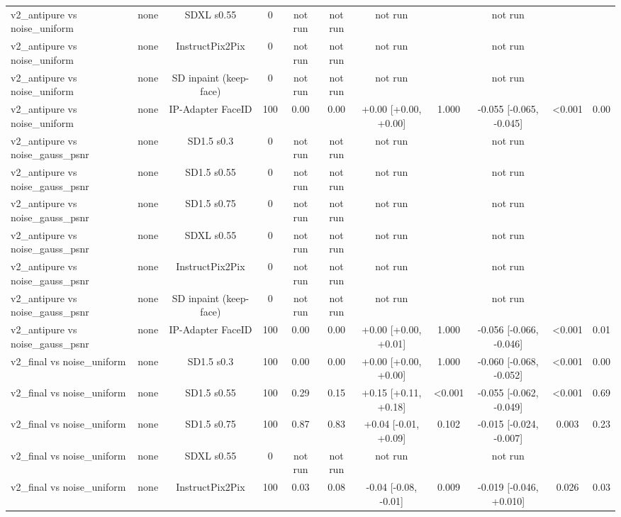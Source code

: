 \begin{table}[t]
{\begin{tabular}{lcccccccccc}
v2\_antipure vs noise\_uniform & none & SDXL s0.55 & 0 & not run & not run & not run &  & not run &  &  \\
v2\_antipure vs noise\_uniform & none & InstructPix2Pix & 0 & not run & not run & not run &  & not run &  &  \\
v2\_antipure vs noise\_uniform & none & SD inpaint (keep-face) & 0 & not run & not run & not run &  & not run &  &  \\
v2\_antipure vs noise\_uniform & none & IP-Adapter FaceID & 100 & 0.00 & 0.00 & +0.00 [+0.00, +0.00] & 1.000 & -0.055 [-0.065, -0.045] & <0.001 & 0.00 \\
v2\_antipure vs noise\_gauss\_psnr & none & SD1.5 s0.3 & 0 & not run & not run & not run &  & not run &  &  \\
v2\_antipure vs noise\_gauss\_psnr & none & SD1.5 s0.55 & 0 & not run & not run & not run &  & not run &  &  \\
v2\_antipure vs noise\_gauss\_psnr & none & SD1.5 s0.75 & 0 & not run & not run & not run &  & not run &  &  \\
v2\_antipure vs noise\_gauss\_psnr & none & SDXL s0.55 & 0 & not run & not run & not run &  & not run &  &  \\
v2\_antipure vs noise\_gauss\_psnr & none & InstructPix2Pix & 0 & not run & not run & not run &  & not run &  &  \\
v2\_antipure vs noise\_gauss\_psnr & none & SD inpaint (keep-face) & 0 & not run & not run & not run &  & not run &  &  \\
v2\_antipure vs noise\_gauss\_psnr & none & IP-Adapter FaceID & 100 & 0.00 & 0.00 & +0.00 [+0.00, +0.01] & 1.000 & -0.056 [-0.066, -0.046] & <0.001 & 0.01 \\
v2\_final vs noise\_uniform & none & SD1.5 s0.3 & 100 & 0.00 & 0.00 & +0.00 [+0.00, +0.00] & 1.000 & -0.060 [-0.068, -0.052] & <0.001 & 0.00 \\
v2\_final vs noise\_uniform & none & SD1.5 s0.55 & 100 & 0.29 & 0.15 & +0.15 [+0.11, +0.18] & <0.001 & -0.055 [-0.062, -0.049] & <0.001 & 0.69 \\
v2\_final vs noise\_uniform & none & SD1.5 s0.75 & 100 & 0.87 & 0.83 & +0.04 [-0.01, +0.09] & 0.102 & -0.015 [-0.024, -0.007] & 0.003 & 0.23 \\
v2\_final vs noise\_uniform & none & SDXL s0.55 & 0 & not run & not run & not run &  & not run &  &  \\
v2\_final vs noise\_uniform & none & InstructPix2Pix & 100 & 0.03 & 0.08 & -0.04 [-0.08, -0.01] & 0.009 & -0.019 [-0.046, +0.010] & 0.026 & 0.03 \\

\end{tabular}}
\end{table}
